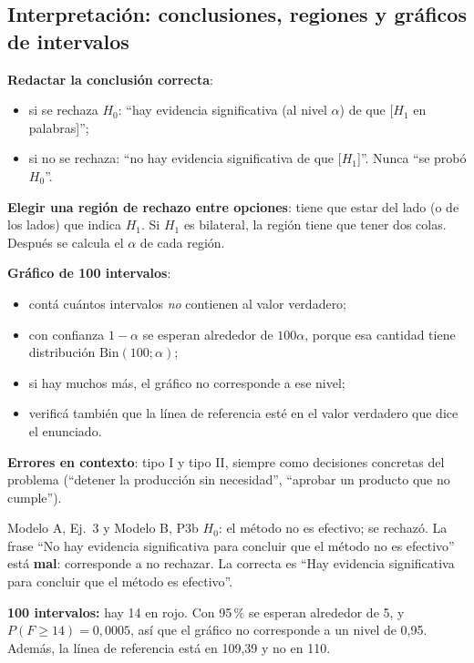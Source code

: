 \subsection{Interpretación: conclusiones, regiones y gráficos de intervalos}\label{p:interp}
\begin{pasos}
\begin{pasolista}
\item \textbf{Redactar la conclusión correcta}:
\begin{itemize}
\item si se rechaza $H_0$: ``hay evidencia significativa (al nivel $\alpha$) de que [$H_1$ en palabras]'';
\item si no se rechaza: ``no hay evidencia significativa de que [$H_1$]''. Nunca ``se probó $H_0$''.
\end{itemize}
\item \textbf{Elegir una región de rechazo entre opciones}: tiene que estar del lado (o de los lados) que indica $H_1$. Si $H_1$ es bilateral, la región tiene que tener dos colas. Después se calcula el $\alpha$ de cada región.
\item \textbf{Gráfico de 100 intervalos}:
\begin{itemize}
\item contá cuántos intervalos \emph{no} contienen al valor verdadero;
\item con confianza $1-\alpha$ se esperan alrededor de $100\alpha$, porque esa cantidad tiene distribución $\mathrm{Bin}(100;\alpha)$;
\item si hay muchos más, el gráfico no corresponde a ese nivel;
\item verificá también que la línea de referencia esté en el valor verdadero que dice el enunciado.
\end{itemize}
\item \textbf{Errores en contexto}: tipo I y tipo II, siempre como decisiones concretas del problema (``detener la producción sin necesidad'', ``aprobar un producto que no cumple'').
\end{pasolista}
\end{pasos}
\begin{modelo}{Modelo A, Ej.\ 3 y Modelo B, P3b}
$H_0$: el método no es efectivo; se rechazó. La frase ``No hay evidencia significativa para concluir que el método no es efectivo'' está \textbf{mal}: corresponde a no rechazar. La correcta es ``Hay evidencia significativa para concluir que el método es efectivo''.

\textbf{100 intervalos:} hay 14 en rojo. Con 95\,\% se esperan alrededor de 5, y $P(F\ge14)=0{,}0005$, así que el gráfico no corresponde a un nivel de 0,95. Además, la línea de referencia está en 109,39 y no en 110.
\end{modelo}
